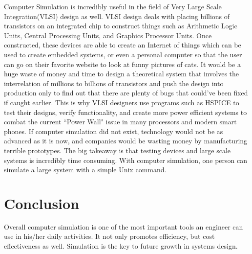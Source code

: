 \documentclass[12pt]{article}
\begin{document}
Computer Simulation is incredibly useful in the field of Very Large Scale Integration(VLSI) design as well. VLSI design deals with placing billions of transistors on an integrated chip to construct things such as Arithmetic Logic Units, Central Processing Units, and Graphics Processor Units. Once constructed, these devices are able to create an Internet of things which can be used to create embedded systems, or even a personal computer so that the user can go on their favorite website to look at funny pictures of cats. It would be a huge waste of money and time to design a theoretical system that involves the interrelation of millions to billions of transistors and push the design into production only to find out that there are plenty of bugs that could've been fixed if caught earlier. This is why VLSI designers use programs such as HSPICE to test their designs, verify functionality, and create more power efficient systems to combat the current ``Power Wall" issue in many processors and modern smart phones. If computer simulation did not exist, technology would not be as advanced as it is now, and companies would be wasting money by manufacturing terrible prototypes. The big takeaway is that testing devices and large scale systems is incredibly time consuming. With computer simulation, one person can simulate a large system with a simple Unix command.

\section{Conclusion}
Overall computer simulation is one of the most important tools an engineer can use in his/her daily activities. It not only promotes efficiency, but cost effectiveness as well. Simulation is the key to future growth in systems design.
\end{document}
